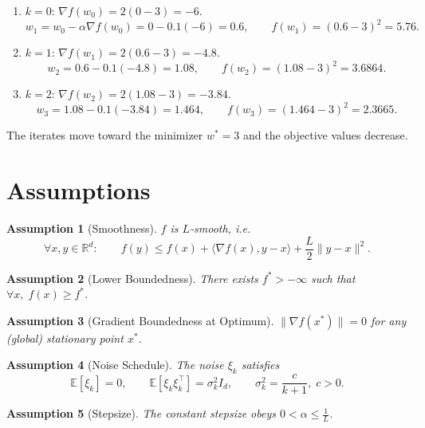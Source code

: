 \documentclass{article}
\newtheorem{assumption}{Assumption}
\newcommand{\E}{\mathbb{E}}
\newcommand{\R}{\mathbb{R}}
\begin{document}
\begin{enumerate}[label=\textbf{Iter \arabic*:}, leftmargin=*]
\item $k=0$: $\nabla f(w_{0})=2(0-3)=-6$.
\[
w_{1}=w_{0}-\alpha\nabla f(w_{0})=0-0.1(-6)=0.6,\qquad 
f(w_{1})=(0.6-3)^{2}=5.76.
\]

\item $k=1$: $\nabla f(w_{1})=2(0.6-3)=-4.8$.
\[
w_{2}=0.6-0.1(-4.8)=1.08,\qquad 
f(w_{2})=(1.08-3)^{2}=3.6864.
\]

\item $k=2$: $\nabla f(w_{2})=2(1.08-3)=-3.84$.
\[
w_{3}=1.08-0.1(-3.84)=1.464,\qquad 
f(w_{3})=(1.464-3)^{2}=2.3665.
\]
\end{enumerate}
The iterates move toward the minimizer $w^{*}=3$ and the objective values decrease.

\newpage
\section*{Assumptions}
\begin{assumption}[Smoothness]\label{as:smooth}
$f$ is $L$‑smooth, i.e.
\[
\forall x,y\in\R^{d}:\qquad 
f(y)\le f(x)+\langle\nabla f(x),y-x\rangle+\frac{L}{2}\|y-x\|^{2}.
\]
\end{assumption}

\begin{assumption}[Lower Boundedness]\label{as:lb}
There exists $f^{*}>-\infty$ such that $\forall x,\; f(x)\ge f^{*}$.
\end{assumption}

\begin{assumption}[Gradient Boundedness at Optimum]\label{as:gradopt}
$\|\nabla f(x^{*})\|=0$ for any (global) stationary point $x^{*}$.
\end{assumption}

\begin{assumption}[Noise Schedule]\label{as:noise}
The noise $\xi_{k}$ satisfies
\[
\E[\xi_{k}]=0,\qquad 
\E[\xi_{k}\xi_{k}^{\top}]=\sigma_{k}^{2}I_{d},\qquad 
\sigma_{k}^{2}= \frac{c}{k+1},\;c>0.
\]
\end{assumption}

\begin{assumption}[Stepsize]\label{as:stepsize}
The constant stepsize obeys $0<\alpha\le\frac{1}{L}$.
\end{assumption}
\end{document}
